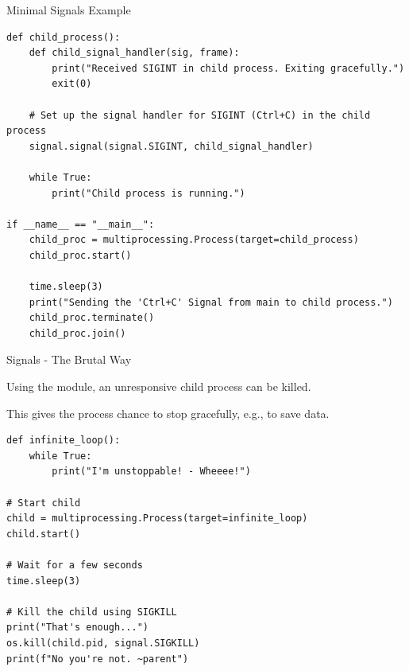 \documentclass[12pt, aspectratio=169, usepdftitle=false, handout]{beamer}
\newcommand{\pp}[1]{\lpl{#1}}
\begin{document}
\begin{frame}[fragile]{Minimal Signals Example}
	\begin{lstlisting}[language=pytiny]
def child_process():
    def child_signal_handler(sig, frame):
        print("Received SIGINT in child process. Exiting gracefully.")
        exit(0)

    # Set up the signal handler for SIGINT (Ctrl+C) in the child process
    signal.signal(signal.SIGINT, child_signal_handler)

    while True:
        print("Child process is running.")

if __name__ == "__main__":
    child_proc = multiprocessing.Process(target=child_process)
    child_proc.start()

    time.sleep(3)
    print("Sending the 'Ctrl+C' Signal from main to child process.")
    child_proc.terminate()
    child_proc.join()
	\end{lstlisting}
\end{frame}


\begin{frame}[fragile]{Signals - The Brutal Way}

		Using the \pp{os} module, an unresponsive child process can be  killed.
		
		\pause
		
		This gives the process  chance to stop gracefully, e.g., to save data.

	\begin{lstlisting}[language=pytiny]
def infinite_loop():
    while True:
        print("I'm unstoppable! - Wheeee!")

# Start child
child = multiprocessing.Process(target=infinite_loop)
child.start()

# Wait for a few seconds
time.sleep(3)

# Kill the child using SIGKILL
print("That's enough...")
os.kill(child.pid, signal.SIGKILL)
print(f"No you're not. ~parent")
	\end{lstlisting}
\end{frame}
\end{document}

